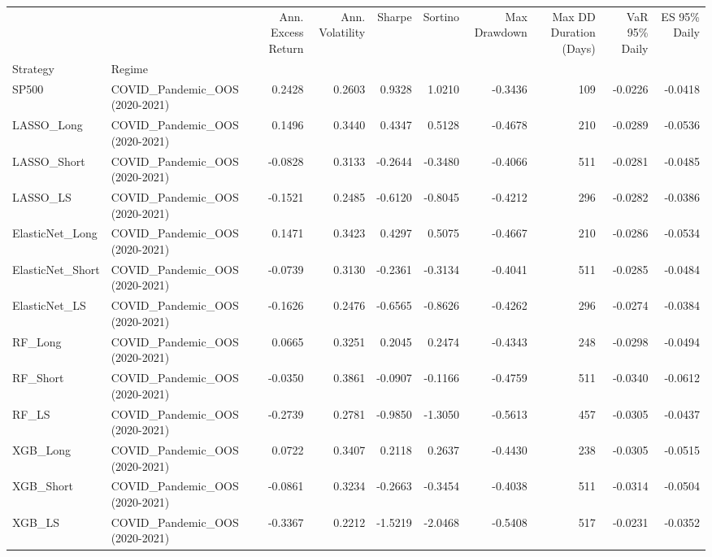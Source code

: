 \begin{tabular}{llrrrrrrrr}
\toprule
 &  & Ann. Excess Return & Ann. Volatility & Sharpe & Sortino & Max Drawdown & Max DD Duration (Days) & VaR 95\% Daily & ES 95\% Daily \\
Strategy & Regime &  &  &  &  &  &  &  &  \\
\midrule
SP500 & COVID\_Pandemic\_OOS (2020-2021) & 0.2428 & 0.2603 & 0.9328 & 1.0210 & -0.3436 & 109 & -0.0226 & -0.0418 \\
\cline{1-10}
LASSO\_Long & COVID\_Pandemic\_OOS (2020-2021) & 0.1496 & 0.3440 & 0.4347 & 0.5128 & -0.4678 & 210 & -0.0289 & -0.0536 \\
\cline{1-10}
LASSO\_Short & COVID\_Pandemic\_OOS (2020-2021) & -0.0828 & 0.3133 & -0.2644 & -0.3480 & -0.4066 & 511 & -0.0281 & -0.0485 \\
\cline{1-10}
LASSO\_LS & COVID\_Pandemic\_OOS (2020-2021) & -0.1521 & 0.2485 & -0.6120 & -0.8045 & -0.4212 & 296 & -0.0282 & -0.0386 \\
\cline{1-10}
ElasticNet\_Long & COVID\_Pandemic\_OOS (2020-2021) & 0.1471 & 0.3423 & 0.4297 & 0.5075 & -0.4667 & 210 & -0.0286 & -0.0534 \\
\cline{1-10}
ElasticNet\_Short & COVID\_Pandemic\_OOS (2020-2021) & -0.0739 & 0.3130 & -0.2361 & -0.3134 & -0.4041 & 511 & -0.0285 & -0.0484 \\
\cline{1-10}
ElasticNet\_LS & COVID\_Pandemic\_OOS (2020-2021) & -0.1626 & 0.2476 & -0.6565 & -0.8626 & -0.4262 & 296 & -0.0274 & -0.0384 \\
\cline{1-10}
RF\_Long & COVID\_Pandemic\_OOS (2020-2021) & 0.0665 & 0.3251 & 0.2045 & 0.2474 & -0.4343 & 248 & -0.0298 & -0.0494 \\
\cline{1-10}
RF\_Short & COVID\_Pandemic\_OOS (2020-2021) & -0.0350 & 0.3861 & -0.0907 & -0.1166 & -0.4759 & 511 & -0.0340 & -0.0612 \\
\cline{1-10}
RF\_LS & COVID\_Pandemic\_OOS (2020-2021) & -0.2739 & 0.2781 & -0.9850 & -1.3050 & -0.5613 & 457 & -0.0305 & -0.0437 \\
\cline{1-10}
XGB\_Long & COVID\_Pandemic\_OOS (2020-2021) & 0.0722 & 0.3407 & 0.2118 & 0.2637 & -0.4430 & 238 & -0.0305 & -0.0515 \\
\cline{1-10}
XGB\_Short & COVID\_Pandemic\_OOS (2020-2021) & -0.0861 & 0.3234 & -0.2663 & -0.3454 & -0.4038 & 511 & -0.0314 & -0.0504 \\
\cline{1-10}
XGB\_LS & COVID\_Pandemic\_OOS (2020-2021) & -0.3367 & 0.2212 & -1.5219 & -2.0468 & -0.5408 & 517 & -0.0231 & -0.0352 \\

\end{tabular}
